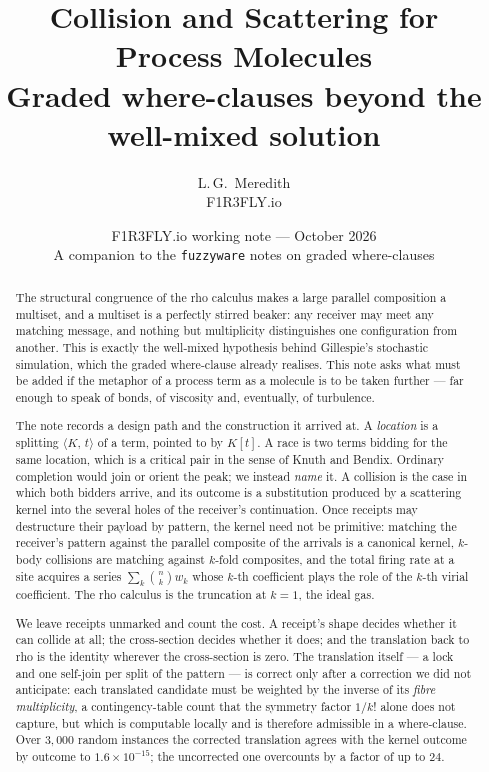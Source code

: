 \documentclass[11pt,a4paper]{article}
\title{\bfseries Collision and Scattering for Process Molecules\\[4pt]
\large Graded where-clauses beyond the well-mixed solution}
\author{L.\,G.\ Meredith\\ \small F1R3FLY.io}
\date{F1R3FLY.io working note --- October 2026\\[2pt]
\normalsize A companion to the \texttt{fuzzyware} notes on graded where-clauses}
\theoremstyle{plain}
\theoremstyle{definition}
\theoremstyle{remark}
\newcommand{\rhoc}{\textsf{rho}}
\newcommand{\loc}[2]{\langle #1,\, #2\rangle}
\begin{document}
\maketitle

\begin{abstract}
The structural congruence of the rho calculus makes a large parallel
composition a multiset, and a multiset is a perfectly stirred beaker: any
receiver may meet any matching message, and nothing but multiplicity
distinguishes one configuration from another. This is exactly the
well-mixed hypothesis behind Gillespie's stochastic simulation, which the
graded where-clause already realises. This note asks what must be added if
the metaphor of a process term as a molecule is to be taken further --- far
enough to speak of bonds, of viscosity and, eventually, of turbulence.

The note records a design path and the construction it arrived at. A
\emph{location} is a splitting $\loc{K}{t}$ of a term, pointed to by
$K[t]$. A race is two terms bidding for the same location, which is a
critical pair in the sense of Knuth and Bendix. Ordinary completion would
join or orient the peak; we instead \emph{name} it. A collision is the case in
which both bidders arrive, and its outcome is a substitution produced by a
scattering kernel into the several holes of the receiver's continuation. Once
receipts may destructure their payload by pattern, the kernel need not be
primitive: matching the receiver's pattern against the parallel composite of
the arrivals is a canonical kernel, $k$-body collisions are matching against
$k$-fold composites, and the total firing rate at a site acquires a series
$\sum_k \binom{n}{k}w_k$ whose $k$-th coefficient plays the role of the $k$-th
virial coefficient. The \rhoc{} calculus is the truncation at $k=1$, the ideal
gas.

We leave receipts unmarked and count the cost. A receipt's shape decides
whether it can collide at all; the cross-section decides whether it does; and
the translation back to \rhoc{} is the identity wherever the cross-section is
zero. The translation itself --- a lock and one self-join per split of the
pattern --- is correct only after a correction we did not anticipate: each
translated candidate must be weighted by the inverse of its \emph{fibre
multiplicity}, a contingency-table count that the symmetry factor $1/k!$
alone does not capture, but which is computable locally and is therefore
admissible in a where-clause. Over $3{,}000$ random instances the corrected
translation agrees with the kernel outcome by outcome to $1.6\times10^{-15}$;
the uncorrected one overcounts by a factor of up to $24$.


\end{abstract}
\end{document}
